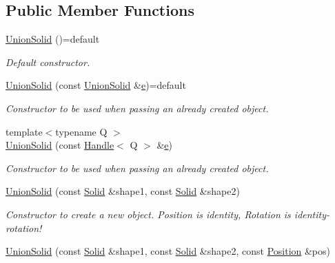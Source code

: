 \subsection*{Public Member Functions}
\begin{DoxyCompactItemize}
\item 
\hyperlink{class_d_d4hep_1_1_geometry_1_1_union_solid_a2f43253eac7e1983c116d8133c1ec30b}{Union\+Solid} ()=default
\begin{DoxyCompactList}\small\item\em Default constructor. \end{DoxyCompactList}\item 
\hyperlink{class_d_d4hep_1_1_geometry_1_1_union_solid_a985a341dd380b15f19c46ad577d36677}{Union\+Solid} (const \hyperlink{class_d_d4hep_1_1_geometry_1_1_union_solid}{Union\+Solid} \&\hyperlink{_volumes_8cpp_a8a9a1f93e9b09afccaec215310e64142}{e})=default
\begin{DoxyCompactList}\small\item\em Constructor to be used when passing an already created object. \end{DoxyCompactList}\item 
{\footnotesize template$<$typename Q $>$ }\\\hyperlink{class_d_d4hep_1_1_geometry_1_1_union_solid_abbc25f5df50a07beaef790250d803faf}{Union\+Solid} (const \hyperlink{class_d_d4hep_1_1_handle}{Handle}$<$ Q $>$ \&\hyperlink{_volumes_8cpp_a8a9a1f93e9b09afccaec215310e64142}{e})
\begin{DoxyCompactList}\small\item\em Constructor to be used when passing an already created object. \end{DoxyCompactList}\item 
\hyperlink{class_d_d4hep_1_1_geometry_1_1_union_solid_ac7992ce96fd9cb28f65d7c85ee114be7}{Union\+Solid} (const \hyperlink{namespace_d_d4hep_1_1_geometry_a83de90a8dcc7378ba47d54ef9a6a687b}{Solid} \&shape1, const \hyperlink{namespace_d_d4hep_1_1_geometry_a83de90a8dcc7378ba47d54ef9a6a687b}{Solid} \&shape2)
\begin{DoxyCompactList}\small\item\em Constructor to create a new object. Position is identity, Rotation is identity-\/rotation! \end{DoxyCompactList}\item 
\hyperlink{class_d_d4hep_1_1_geometry_1_1_union_solid_a0decd4e3d915dc725a2e85163fc0b604}{Union\+Solid} (const \hyperlink{namespace_d_d4hep_1_1_geometry_a83de90a8dcc7378ba47d54ef9a6a687b}{Solid} \&shape1, const \hyperlink{namespace_d_d4hep_1_1_geometry_a83de90a8dcc7378ba47d54ef9a6a687b}{Solid} \&shape2, const \hyperlink{namespace_d_d4hep_1_1_geometry_a55083902099d03506c6db01b80404900}{Position} \&pos)

\end{DoxyCompactItemize}
